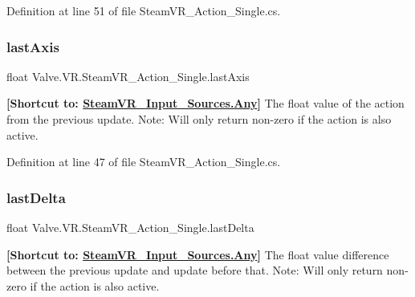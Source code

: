Definition at line 51 of file Steam\+V\+R\+\_\+\+Action\+\_\+\+Single.\+cs.

\mbox{\label{class_valve_1_1_v_r_1_1_steam_v_r___action___single_a8a00ad5421754252a7e05ec832a3468b}} 
\subsubsection{\texorpdfstring{lastAxis}{lastAxis}}
{\footnotesize\ttfamily float Valve.\+V\+R.\+Steam\+V\+R\+\_\+\+Action\+\_\+\+Single.\+last\+Axis\hspace{0.3cm}{\ttfamily [get]}}



{\bfseries{\mbox{[}Shortcut to\+: \mbox{\hyperlink{namespace_valve_1_1_v_r_a82e5bf501cc3aa155444ee3f0662853faed36a1ef76a59ee3f15180e0441188ad}{Steam\+V\+R\+\_\+\+Input\+\_\+\+Sources.\+Any}}\mbox{]}}} The float value of the action from the previous update. Note\+: Will only return non-\/zero if the action is also active. 



Definition at line 47 of file Steam\+V\+R\+\_\+\+Action\+\_\+\+Single.\+cs.

\mbox{\label{class_valve_1_1_v_r_1_1_steam_v_r___action___single_a7debc59f65b7f98973df24c8de93ed6c}} 
\subsubsection{\texorpdfstring{lastDelta}{lastDelta}}
{\footnotesize\ttfamily float Valve.\+V\+R.\+Steam\+V\+R\+\_\+\+Action\+\_\+\+Single.\+last\+Delta\hspace{0.3cm}{\ttfamily [get]}}



{\bfseries{\mbox{[}Shortcut to\+: \mbox{\hyperlink{namespace_valve_1_1_v_r_a82e5bf501cc3aa155444ee3f0662853faed36a1ef76a59ee3f15180e0441188ad}{Steam\+V\+R\+\_\+\+Input\+\_\+\+Sources.\+Any}}\mbox{]}}} The float value difference between the previous update and update before that. Note\+: Will only return non-\/zero if the action is also active. 



